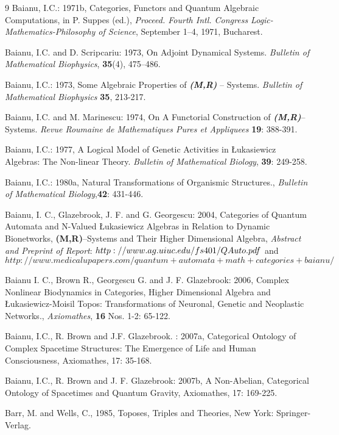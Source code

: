 \documentclass[12pt]{article}
\begin{document}
\begin{thebibliography} {9}
Baianu, I.C.: 1971b, Categories, Functors and Quantum Algebraic
Computations, in P. Suppes (ed.), \emph{Proceed. Fourth Intl. Congress Logic-Mathematics-Philosophy of Science}, September 1--4, 1971, Bucharest.

Baianu, I.C. and D. Scripcariu: 1973, On Adjoint Dynamical Systems. \emph{Bulletin of Mathematical Biophysics}, \textbf{35}(4), 475--486.

Baianu, I.C.: 1973, Some Algebraic Properties of \emph{\textbf{(M,R)}} -- Systems. \emph{Bulletin of Mathematical Biophysics} \textbf{35}, 213-217.

Baianu, I.C. and M. Marinescu: 1974, On A Functorial Construction of \emph{\textbf{(M,R)}}-- Systems. \emph{Revue Roumaine de Mathematiques Pures et Appliquees} \textbf{19}: 388-391.

Baianu, I.C.: 1977, A Logical Model of Genetic Activities in \L ukasiewicz Algebras: The Non-linear Theory. \emph{Bulletin of Mathematical Biology},
\textbf{39}: 249-258.

Baianu, I.C.: 1980a, Natural Transformations of Organismic Structures.,
\emph{Bulletin of Mathematical Biology},\textbf{42}: 431-446.

Baianu, I. C., Glazebrook, J. F. and G. Georgescu: 2004, Categories of Quantum Automata and N-Valued \L ukasiewicz Algebras in Relation to Dynamic Bionetworks, \textbf{(M,R)}--Systems and Their Higher Dimensional Algebra, \emph{Abstract and Preprint of Report}: $\\http://www.ag.uiuc.edu/fs401/QAuto.pdf $ and $http://www.medicalupapers.com/quantum+automata+math+categories+baianu/$

Baianu I. C., Brown R., Georgescu G. and J. F. Glazebrook: 2006, Complex Nonlinear Biodynamics in Categories, Higher Dimensional Algebra and \L ukasiewicz-Moisil Topos: Transformations of Neuronal, Genetic and Neoplastic Networks., \emph{Axiomathes}, \textbf{16} Nos. 1-2: 65-122.

Baianu, I.C., R. Brown and J.F. Glazebrook. : 2007a, Categorical Ontology of Complex Spacetime Structures: The Emergence of Life and Human Consciousness, Axiomathes, 17: 35-168.

Baianu, I.C.,  R. Brown and J. F. Glazebrook: 2007b, A Non-Abelian, Categorical Ontology of Spacetimes and Quantum Gravity, Axiomathes, 17: 169-225.

Barr, M. and Wells, C., 1985, Toposes, Triples and Theories, New York: Springer-Verlag.
 

\end{thebibliography}
\end{document}
